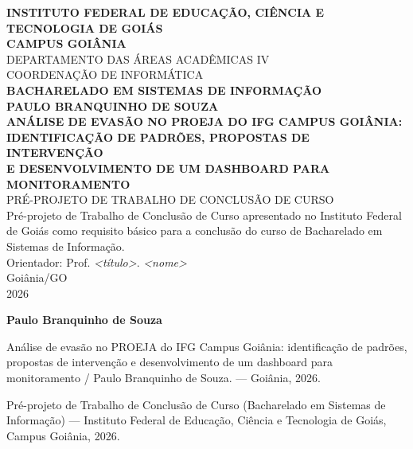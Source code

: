 \documentclass[12pt,a4paper]{article}
\begin{document}
\begin{titlepage}
  \begin{center}
    \textbf{INSTITUTO FEDERAL DE EDUCAÇÃO, CIÊNCIA E TECNOLOGIA DE GOIÁS}\\[0.2cm]
    \textbf{CAMPUS GOIÂNIA}\\[0.2cm]
    DEPARTAMENTO DAS ÁREAS ACADÊMICAS IV\\[0.2cm]
    COORDENAÇÃO DE INFORMÁTICA\\[0.2cm]
    \textbf{BACHARELADO EM SISTEMAS DE INFORMAÇÃO}\\[2.5cm]

    \textbf{PAULO BRANQUINHO DE SOUZA}\\[3.5cm]

    \textbf{ANÁLISE DE EVASÃO NO PROEJA DO IFG CAMPUS GOIÂNIA:}\\[0.15cm]
    \textbf{IDENTIFICAÇÃO DE PADRÕES, PROPOSTAS DE INTERVENÇÃO}\\[0.15cm]
    \textbf{E DESENVOLVIMENTO DE UM DASHBOARD PARA MONITORAMENTO}\\[3.5cm]

    PRÉ-PROJETO DE TRABALHO DE CONCLUSÃO DE CURSO\\[0.3cm]
    \onehalfspacing
    Pré-projeto de Trabalho de Conclusão de Curso apresentado no Instituto Federal de Goiás como requisito básico para a conclusão do curso de Bacharelado em Sistemas de Informação.\\[1cm]

    Orientador: Prof. \textit{<título>}. \textit{<nome>}\\[3cm]

    Goiânia/GO\\
    2026
  \end{center}
\end{titlepage}

\newpage
\thispagestyle{empty}
\begin{center}
  \textbf{Paulo Branquinho de Souza}
\end{center}

\noindent Análise de evasão no PROEJA do IFG Campus Goiânia: identificação de padrões, propostas de intervenção e desenvolvimento de um dashboard para monitoramento / Paulo Branquinho de Souza. --- Goiânia, 2026.

\vspace{0.8cm}
\noindent Pré-projeto de Trabalho de Conclusão de Curso (Bacharelado em Sistemas de Informação) --- Instituto Federal de Educação, Ciência e Tecnologia de Goiás, Campus Goiânia, 2026.
\end{document}
